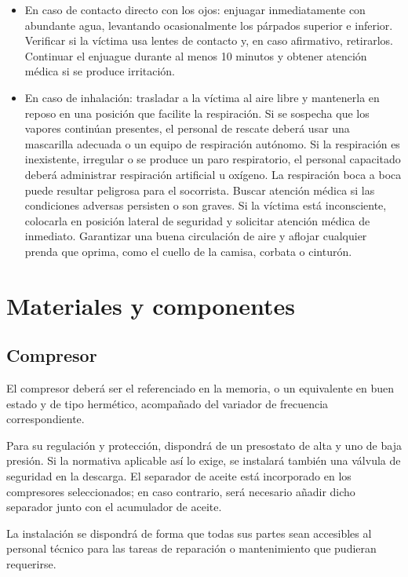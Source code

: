 \documentclass[../main.tex]{subfiles}
\begin{document}
\begin{itemize}
    \item En caso de contacto directo con los ojos: enjuagar inmediatamente con abundante agua, levantando ocasionalmente los párpados superior e inferior. Verificar si la víctima usa lentes de contacto y, en caso afirmativo, retirarlos. Continuar el enjuague durante al menos 10 minutos y obtener atención médica si se produce irritación.
    \item En caso de inhalación: trasladar a la víctima al aire libre y mantenerla en reposo en una posición que facilite la respiración. Si se sospecha que los vapores continúan presentes, el personal de rescate deberá usar una mascarilla adecuada o un equipo de respiración autónomo. Si la respiración es inexistente, irregular o se produce un paro respiratorio, el personal capacitado deberá administrar respiración artificial u oxígeno. La respiración boca a boca puede resultar peligrosa para el socorrista. Buscar atención médica si las condiciones adversas persisten o son graves. Si la víctima está inconsciente, colocarla en posición lateral de seguridad y solicitar atención médica de inmediato. Garantizar una buena circulación de aire y aflojar cualquier prenda que oprima, como el cuello de la camisa, corbata o cinturón.
\end{itemize}

\newpage

\section{Materiales y componentes}

\subsection{Compresor}

El compresor deberá ser el referenciado en la memoria, o un equivalente en buen estado y de tipo hermético, acompañado del variador de frecuencia correspondiente.

Para su regulación y protección, dispondrá de un presostato de alta y uno de baja presión. Si la normativa aplicable así lo exige, se instalará también una válvula de seguridad en la descarga. El separador de aceite está incorporado en los compresores seleccionados; en caso contrario, será necesario añadir dicho separador junto con el acumulador de aceite.

La instalación se dispondrá de forma que todas sus partes sean accesibles al personal técnico para las tareas de reparación o mantenimiento que pudieran requerirse.
\end{document}
